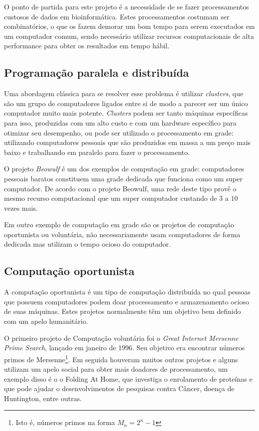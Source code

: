 
O ponto de partida para este projeto é a necessidade de se fazer processamentos custosos de 
dados em bioinformática. Estes processamentos costumam ser combinatórios, o que os fazem
demorar um bom tempo para serem executados em um computador comum, sendo necessário utilizar recursos
computacionais de alta performance para obter os resultados em tempo hábil.

\subsection{Programação paralela e distribuída}

Uma abordagem clássica para se resolver esse problema é utilizar \textit{clusters}, que são um grupo de computadores
ligados entre si de modo a parecer ser um único computador muito mais potente. \textit{Clusters} podem ser tanto máquinas
específicas para isso, produzidas com um alto custo e com um hardware específico para otimizar seu desempenho, ou 
pode ser utilizado o processamento em grade: utilizando computadores pessoais que são produzidos em massa a um preço mais baixo e 
trabalhando em paralelo para fazer o processamento. 

O projeto \emph{Beowulf} é um dos exemplos de computação em grade: computadores pessoais baratos constituem uma grade dedicada 
que funciona como um super computador. De acordo com o projeto Beowulf, uma rede deste tipo provê o mesmo recurso computacional 
que um super computador custando de $3$ a $10$ vezes mais. 

Em outro exemplo de computação em grade são os projetos de computação oportunista ou voluntária, 
não necessariamente usam computadores de forma dedicada mas utilizam o tempo ocioso do computador.

 



\subsection{Computação oportunista}


A computação oportunista é um tipo de computação distribuída no qual pessoas que possuem computadores podem doar processamento e
armazenamento ocioso de suas máquinas. Estes projetos normalmente têm um objetivo bem definido com um apelo humanitário.

O primeiro projeto de Computação voluntária foi o \textit{Great Internet Mersenne Prime Search}, lançado em janeiro de 1996. 
Seu objetivo era encontrar números primos de Mersenne\footnote{Isto é, números primos na forma $M_n = 2^n - 1$}. Em seguida houveram 
muitos outros projetos e alguns utilizam um apelo social para obter mais doadores de processamento, um exemplo disso é o
o Folding At Home, que investiga o enrolamento de proteínas e que pode ajudar o desenvolvimentos de pesquisas contra 
Câncer, doença de Huntington, entre outras. 

